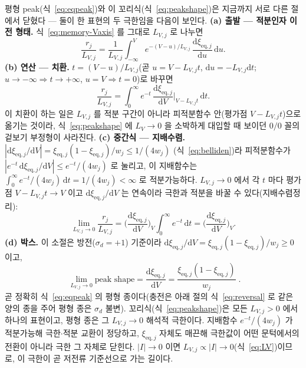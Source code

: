 \documentclass[11pt,a4paper]{article}
\newcommand{\dd}{\mathrm{d}}
\newcommand{\eq}{\mathrm{eq}}
\begin{document}
평형 peak(식~\eqref{eq:eqpeak})와 이 꼬리식(식~\eqref{eq:peakshape})은 지금까지 서로 다른 절에서
닫혔다 --- 둘이 한 표현의 두 극한임을 다음이 보인다. \textbf{(a) 출발 --- 적분인자 이전 형태.}
식~\eqref{eq:memory-Vaxis} 를 그대로 $L_{V,j}$ 로 나누면
\begin{equation}
\frac{r_j}{L_{V,j}}=\frac{1}{L_{V,j}}\int_{-\infty}^{V} e^{-(V-u)/L_{V,j}}\,\frac{\dd\xi_{\eq,j}}{\dd u}\,\dd u.
\label{eq:tail-limit-start}
\end{equation}
\textbf{(b) 연산 --- 치환.} $t=(V-u)/L_{V,j}$(곧 $u=V-L_{V,j}t$, $\dd u=-L_{V,j}\dd t$; $u\to-\infty
\Rightarrow t\to+\infty$, $u=V\Rightarrow t=0$)로 바꾸면
\begin{equation}
\frac{r_j}{L_{V,j}}=\int_0^{\infty} e^{-t}\,\frac{\dd\xi_{\eq,j}}{\dd V}\bigg|_{V-L_{V,j}t}\,\dd t.
\label{eq:tail-limit-sub}
\end{equation}
이 치환이 하는 일은 $L_{V,j}$ 를 적분 구간이 아니라 피적분함수 안(평가점 $V-L_{V,j}t$)으로 옮기는 것이라,
식~\eqref{eq:peakshape} 에 $L_V\to0$ 을 소박하게 대입할 때 보이던 $0/0$ 꼴의 겉보기 부정형이 사라진다.
\textbf{(c) 중간식 --- 지배수렴.} $|\dd\xi_{\eq,j}/\dd V|=\xi_{\eq,j}(1-\xi_{\eq,j})/w_j\le1/(4w_j)$
(식~\eqref{eq:belliden})라 피적분함수가 $|e^{-t}\,\dd\xi_{\eq,j}/\dd V|\le e^{-t}/(4w_j)$ 로 눌리고, 이 지배함수는
$\int_0^\infty e^{-t}/(4w_j)\,\dd t=1/(4w_j)<\infty$ 로 적분가능하다. $L_{V,j}\to0$ 에서 각 $t$ 마다 평가점
$V-L_{V,j}t\to V$ 이고 $\dd\xi_{\eq,j}/\dd V$ 는 연속이라 극한과 적분을 바꿀 수 있다(지배수렴정리):
\begin{equation}
\lim_{L_{V,j}\to0}\frac{r_j}{L_{V,j}}
=\Big(\frac{\dd\xi_{\eq,j}}{\dd V}\Big)_{\!V}\int_0^\infty e^{-t}\,\dd t
=\Big(\frac{\dd\xi_{\eq,j}}{\dd V}\Big)_{\!V}.
\label{eq:tail-limit-mid}
\end{equation}
\textbf{(d) 박스.} 이 소절은 방전($\sigma_d{=}+1$) 기준이라 $\dd\xi_{\eq,j}/\dd V=\xi_{\eq,j}(1-\xi_{\eq,j})/w_j\ge0$ 이고,
\begin{equation}
\boxed{\;\lim_{L_{V,j}\to0}\text{peak shape}
=\frac{\dd\xi_{\eq,j}}{\dd V}
=\frac{\xi_{\eq,j}(1-\xi_{\eq,j})}{w_j}\;.}
\label{eq:tail-limit}
\end{equation}
곧 정확히 식~\eqref{eq:eqpeak} 의 평형 종이다(충전은 아래 절의 식~\eqref{eq:reversal} 로 같은 양의 종을 주어 평형 종은
$\sigma_d$ 불변). 꼬리식(식~\eqref{eq:peakshape})은 모든 $L_{V,j}>0$ 에서 하나의 표현이고, 평형 종은 그 $L_{V,j}\to0$
해석적 극한이다. 지배함수 $e^{-t}/(4w_j)$ 가 적분가능해 극한$\cdot$적분 교환이 정당하고, $\xi_{\eq,j}$ 자체도 매끈해
극한값이 어떤 문턱에서의 전환이 아니라 극한 그 자체로 닫힌다. $|I|\to0$ 이면 $L_{V,j}\propto|I|\to0$(식~\eqref{eq:LV})이므로,
이 극한이 곧 저전류 기준선으로 가는 길이다.
\end{document}
